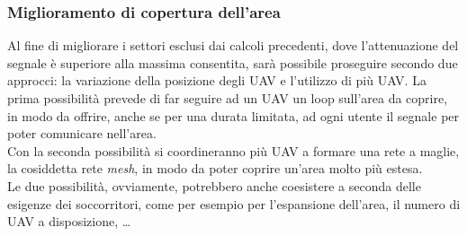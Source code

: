\subsubsection{Miglioramento di copertura dell'area}
Al fine di migliorare i settori esclusi dai calcoli precedenti, dove l'attenuazione del segnale è superiore alla massima consentita, sarà
possibile proseguire secondo due approcci: la variazione della posizione degli \ac{UAV} e l'utilizzo di più \ac{UAV}.
La prima possibilità prevede di far seguire ad un \ac{UAV} un loop sull'area da coprire, in modo da offrire, anche se per una durata 
limitata, ad ogni utente il segnale per poter comunicare nell'area. \\
Con la seconda possibilità si coordineranno più \ac{UAV} a formare una rete a maglie, la cosiddetta rete \emph{mesh}, in modo da poter
coprire un'area molto più estesa. \\ 
Le due possibilità, ovviamente, potrebbero anche coesistere a seconda delle esigenze dei soccorritori, come per esempio per l'espansione
dell'area, il numero di \ac{UAV} a disposizione, \ldots